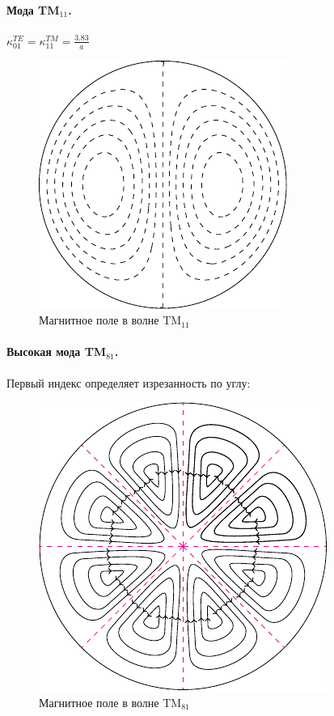 \paragraph{Мода TM$_{11}$.} $\kappa_{01}^{TE}=\kappa_{11}^{TM}=\frac{3.83}{a}$
\begin{figure}[H]
	\centering
	\includegraphics[scale=1.5]{img_lect5/cylindric/TM11}
	\caption{Магнитное поле в волне TM$_{11}$}
	\label{fig:cylinder:TM11}
\end{figure}

\paragraph{Высокая мода TM$_{81}$.} Первый индекс определяет изрезанность по углу: 
\begin{figure}[H]
	\centering
	\includegraphics[scale=1.5]{img_lect5/cylindric/TM81}
	\caption{Магнитное поле в волне TM$_{81}$}
	\label{fig:cylinder:TM81}
\end{figure}

